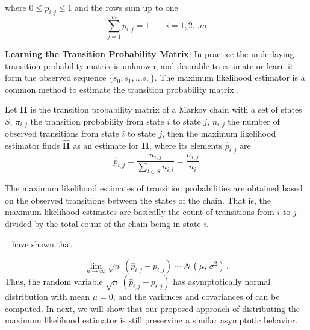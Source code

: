 where $0 \leq p_{i,j}\leq 1 $ and the rows sum up to one 
\begin{equation}
\sum_{j=1}^{m} p_{i,j}= 1\ \ \ \ \ \ \ \ \ i=1,2 \ldots m
\end{equation}

\textbf{Learning the Transition Probability Matrix}. In practice the underlaying transition probability matrix is unknown, and desirable to estimate or learn it form the observed sequence $\{s_0, s_1, \ldots s_n\}$. The maximum likelihood estimator is a common method to estimate the transition probability matrix \cite{anderson1957statistical}.


\begin{definition}
	Let $\boldsymbol{\Pi}$ is the transition probability matrix of a Markov chain with a set of states $S$, 
	$\pi_{i,j}$ the transition probability from state $i$ to state $j$,
	$n_{i,j}$ the number of observed transitions from state $i$ to state $j$,
	then the maximum likelihood estimator finds $\boldsymbol{\hat{\Pi}}$ as an estimate for $\boldsymbol{\Pi}$, where its elements $\hat{p}_{i,j}$ are
	\begin{equation}
	\label{eq:pi_estim}
	\hat{p}_{i,j}=\frac{n_{i,j}}{\sum_{l \in S} n_{i,l}}=\frac{n_{i,j}}{n_{i}}
	\end{equation}
	
\end{definition} 


	The maximum likelihood estimates of transition probabilities are obtained based on the observed transitions between the states of the chain. That is, the maximum likelihood estimates are basically the count of transitions from $i$ to $j$ divided by the total count of the chain being in state $i$.  
	
	\par ~\citet{anderson1957statistical} have shown that 
	
	
	\begin{equation}
	\label{eq:lim_dist}
	\lim_{n\to\infty} \sqrt{n}\ (\hat{p}_{i,j} - {p}_{i,j}) \sim \mathcal{N}(\mu,\,\sigma^{2})\,.
	\end{equation}
Thus, the random variable $\sqrt{n}\ (\hat{p}_{i,j} - {p}_{i,j})$ has asymptotically normal distribution with mean $\mu=0$, and the variances and covariances of can be computed. In next, we will show that our proposed approach of distributing the maximum likelihood estimator is still preserving  a similar asymptotic behavior.


